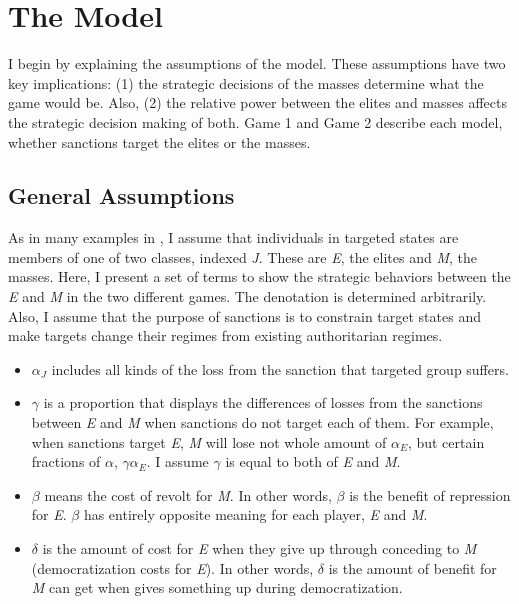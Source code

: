 \documentclass[11pt]{article}
\begin{document}
	\section*{The Model}
	I begin by explaining the assumptions of the model. These assumptions have two key implications: (1) the strategic decisions of the masses determine what the game would be. Also, (2) the relative power between the elites and masses affects the strategic decision making of both. Game 1 and Game 2 describe each model, whether sanctions target the elites or the masses.
	
	\subsection*{General Assumptions}
	As in many examples in \cite{Acemoglu2006a}, I assume that individuals in targeted states are members of one of two classes, indexed \textit{J}. These are \textit{E}, the elites and \textit{M}, the masses. Here, I present a set of terms to show the strategic behaviors between the \textit{E} and \textit{M} in the two different games. The denotation is determined arbitrarily. Also, I assume that the purpose of sanctions is to constrain target states and make targets change their regimes from existing authoritarian regimes.
	
	\begin{itemize}
		\item $\alpha_J$ includes all kinds of the loss from the sanction that targeted group suffers.
		\item $\gamma$ is a proportion that displays the differences of losses from the sanctions between \textit{E} and \textit{M} when sanctions do not target each of them. For example, when sanctions target \textit{E}, \textit{M} will lose not whole amount of $\alpha_{E}$, but certain fractions of $\alpha$, $\gamma\alpha_{E}$. I assume $\gamma$ is equal to both of \textit{E} and \textit{M}.
		\item $\beta$ means the cost of revolt for \textit{M}. In other words, $\beta$ is the benefit of repression for \textit{E}. $\beta$ has entirely opposite meaning for each player, \textit{E} and \textit{M}.
		\item $\delta$ is the amount of cost for \textit{E} when they give up through conceding to \textit{M} (democratization costs for \textit{E}). In other words, $\delta$ is the amount of benefit for \textit{M} can get when  gives something up during democratization.
	\end{itemize}
	
\end{document}
